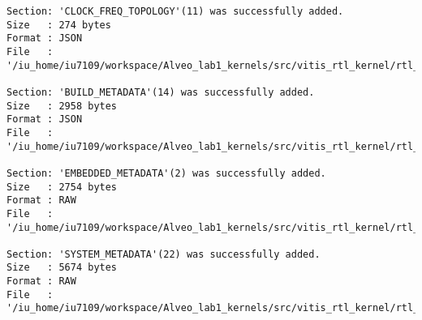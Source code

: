 \begin{center}
\begin{lstlisting}[label=lst:vlog,caption=Файл v++\_vinc.log]
Section: 'CLOCK_FREQ_TOPOLOGY'(11) was successfully added.
Size   : 274 bytes
Format : JSON
File   : '/iu_home/iu7109/workspace/Alveo_lab1_kernels/src/vitis_rtl_kernel/rtl_kernel_wizard_2/_x/link/int/vinc_xml.rtd'

Section: 'BUILD_METADATA'(14) was successfully added.
Size   : 2958 bytes
Format : JSON
File   : '/iu_home/iu7109/workspace/Alveo_lab1_kernels/src/vitis_rtl_kernel/rtl_kernel_wizard_2/_x/link/int/vinc_build.rtd'

Section: 'EMBEDDED_METADATA'(2) was successfully added.
Size   : 2754 bytes
Format : RAW
File   : '/iu_home/iu7109/workspace/Alveo_lab1_kernels/src/vitis_rtl_kernel/rtl_kernel_wizard_2/_x/link/int/vinc.xml'

Section: 'SYSTEM_METADATA'(22) was successfully added.
Size   : 5674 bytes
Format : RAW
File   : '/iu_home/iu7109/workspace/Alveo_lab1_kernels/src/vitis_rtl_kernel/rtl_kernel_wizard_2/_x/link/int/systemDiagramModelSlrBaseAddress.json'


\end{lstlisting}
\end{center}

